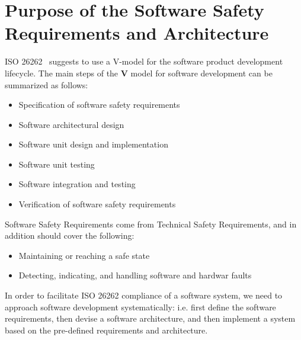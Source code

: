\chapter{Purpose of the Software Safety Requirements and Architecture}
\label{ch:purpose}


ISO 26262~\cite{iso26262} suggests to use a V-model for the software
product development lifecycle.
The main steps of the \textbf{V} model for software development can
be summarized as follows:
\begin{itemize}
  \item Specification of software safety requirements
  \item Software architectural design
  \item Software unit design and implementation
  \item Software unit testing
  \item Software integration and testing
  \item Verification of software safety requirements
\end{itemize}

Software Safety Requirements come from Technical Safety Requirements, 
and in addition should cover the following:
\begin{itemize}
  \item Maintaining or reaching a safe state
  \item Detecting, indicating, and handling software and hardwar faults
\end{itemize}

In order to facilitate ISO 26262 compliance of a software system,
we need to approach software development systematically:
i.e. first define the software requirements, then devise a software
architecture, and then implement a system based on the pre-defined
requirements and architecture.
